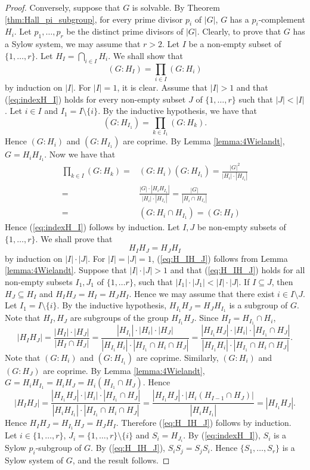 \begin{proof}
    Conversely, suppose that $G$ is solvable. By Theorem \ref{thm:Hall_pi_subgroup}, for every prime divisor $p_i$ of $|G|$, $G$ has a $p_i$-complement $H_i$. Let $p_1,\dots ,p_r$ be the distinct prime divisors of $|G|$. Clearly, to prove that $G$ has a Sylow system, we may assume that $r>2$. Let $I$ be a non-empty subset of $\{ 1,\dots ,r\}$. Let $H_I=\bigcap_{i\in I}H_i$. We shall show that
    \begin{equation}\label{eq:indexH_I}
    (G:H_I)=\prod_{i\in I}(G:H_i)
    \end{equation}
    by induction on $|I|$. For $|I|=1$, it is clear. Assume that $|I|>1$ and that (\ref{eq:indexH_I}) holds for every non-empty subset $J$ of $\{ 1,\dots ,r\}$ such that $|J|<|I|$. Let $i\in I$ and $I_1=I\setminus \{ i\}$. By the inductive hypothesis, we have that
    \[ (G:H_{I_1})=\prod_{k\in I_1}(G:H_k).\]
    Hence $(G:H_i)$ and $(G:H_{I_1})$ are coprime. By Lemma \ref{lemma:4Wielandt}, $G=H_iH_{I_1}$. Now we have that
    \begin{align*}\prod_{k\in I}(G:H_k)=&(G:H_i)(G:H_{I_1})=\frac{|G|^2}{|H_i|\cdot |H_{I_1}|}\\
    =&\frac{|G|\cdot |H_iH_{I_1}|}{|H_i|\cdot |H_{I_1}|}=
    \frac{|G|}{|H_i\cap H_{I_1}|}\\
    =&(G:H_i\cap H_{I_1})=(G:H_I)\end{align*}
    Hence (\ref{eq:indexH_I}) follows by induction.
    Let $I,J$ be non-empty subsets of $\{1,\dots ,r\}$.  We shall prove that \begin{equation}\label{eq:H_IH_J}
        H_IH_J=H_JH_I
    \end{equation} 
    by induction on $|I|\cdot |J|$. For $|I|=|J|=1$, (\ref{eq:H_IH_J}) follows from Lemma \ref{lemma:4Wielandt}. Suppose that $|I|\cdot |J|>1$ and that (\ref{eq:H_IH_J}) holds for all non-empty subsets $I_1,J_1$ of $\{ 1,\dots r\}$, such that $|I_1|\cdot|J_1|<|I|\cdot |J|$. If $I\subseteq J$, then $H_J\subseteq H_I$ and $H_IH_J=H_I=H_JH_I$. Hence we may assume that there exist $i\in I\setminus J$. Let $I_1=I\setminus\{ i\}$. By the inductive hypothesis, $H_{I_1}H_J=H_JH_{I_1}$ is a subgroup of $G$. Note that $H_I,H_J$ are subgroups of the group $H_{I_1}H_J$. Since $H_I=H_{I_1}\cap H_i$, 
    \[ |H_IH_J|=\frac{|H_I|\cdot |H_J|}{|H_I\cap H_J|}=\frac{|H_{I_1}|\cdot |H_i|\cdot|H_J|}{|H_{I_1}H_i|\cdot |H_{I_1}\cap H_i\cap H_J|}=\frac{|H_{I_1}H_J|\cdot |H_i|\cdot|H_{I_1}\cap H_J|}{|H_{I_1}H_i|\cdot |H_{I_1}\cap H_i\cap H_J|}.\]
    Note that $(G:H_i)$ and $(G:H_{I_1})$ are coprime. Similarly, $(G:H_i)$ and $(G:H_J)$ are coprime. By Lemma \ref{lemma:4Wielandt}, $G=H_iH_{I_1}=H_iH_J=H_i(H_{I_1}\cap H_J)$. Hence
    \[ |H_IH_J|=\frac{|H_{I_1}H_J|\cdot |H_i|\cdot|H_{I_1}\cap H_J|}{|H_iH_{I_1}|\cdot |H_{I_1}\cap H_i\cap H_J|}=\frac{|H_{I_1}H_J|\cdot |H_i(H_{I-1}\cap H_J)|}{|H_iH_{I_1}|}=|H_{I_1}H_J|.\]
    Hence $H_IH_J=H_{I_1}H_J=H_JH_I$. Therefore (\ref{eq:H_IH_J}) follows by induction. 
    Let $i\in\{ 1,\dots , r\}$, $J_i=\{1,\dots ,r\}\setminus \{ i\}$ and $S_i=H_{J_i}$. By (\ref{eq:indexH_I}), $S_i$ is a Sylow $p_i$-subgroup of $G$. By (\ref{eq:H_IH_J}), $S_iS_j=S_jS_i$. Hence $\{ S_1,\dots ,S_r\}$ is a Sylow system of $G$, and the result follows. 
\end{proof}

